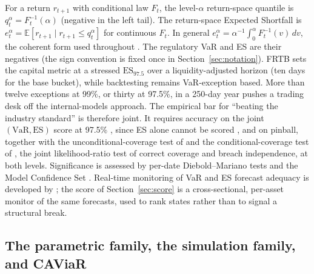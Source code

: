 \documentclass[11pt]{article}
\newcommand{\VaR}{\mathrm{VaR}}
\newcommand{\ES}{\mathrm{ES}}
\theoremstyle{remark}
\begin{document}
For a return $r_{t+1}$ with conditional law $F_t$, the level-$\alpha$
return-space quantile is $q_t^\alpha = F_t^{-1}(\alpha)$ (negative in
the left tail). The return-space Expected Shortfall is
$e_t^\alpha = \mathbb{E}[r_{t+1} \mid r_{t+1} \le q_t^\alpha]$ for continuous
$F_t$. In general $e_t^\alpha=\alpha^{-1}\!\int_0^\alpha F_t^{-1}(v)\,dv$, the
coherent form used throughout \citep{artzner1999, acerbitasche2002}.
The regulatory VaR and ES are their negatives (the sign convention is
fixed once in Section~\ref{sec:notation}). FRTB \citep{bcbs2019frtb} sets the capital metric at a stressed $\ES_{97.5}$ over a liquidity-adjusted horizon (ten days for the base bucket), while backtesting remains VaR-exception based. More than twelve exceptions at 99\%, or thirty at 97.5\%, in a 250-day year pushes a trading desk off the internal-models approach. The empirical bar for ``beating the industry standard'' is therefore joint. It requires accuracy on the joint $(\VaR,\ES)$ score at 97.5\% \citep{fissler2016, patton2019}, since ES alone cannot be scored \citep{gneiting2011}, and on pinball, together with the unconditional-coverage test of \citet{kupiec1995} and the conditional-coverage test of \citet{christoffersen1998}, the joint likelihood-ratio test of correct coverage and breach independence, at both levels. Significance is assessed by per-date Diebold--Mariano tests \citep{dieboldmariano1995} and the Model Confidence Set \citep{hansen2011mcs}. Real-time monitoring of VaR and ES forecast adequacy is developed by \citet{hoga2023monitoring}; the score of Section~\ref{sec:score} is a cross-sectional, per-asset monitor of the same forecasts, used to rank states rather than to signal a structural break.

\subsection{The parametric family, the simulation family, and CAViaR}
\end{document}
